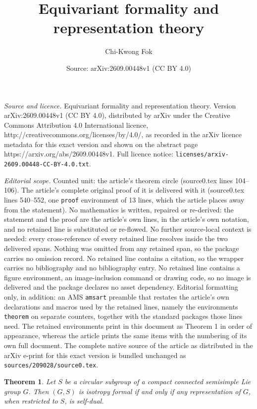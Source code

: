 \documentclass[10pt,a4paper]{amsart}
\title{Equivariant formality and representation theory}
\author{Chi-Kwong Fok}
\date{Source: arXiv:2609.00448v1 (CC BY 4.0)}
\newtheorem{theorem}{Theorem}
\begin{document}
\maketitle

\noindent\emph{Source and licence.} Equivariant formality and representation theory. Version arXiv:2609.00448v1 (CC BY 4.0), distributed by arXiv under the Creative Commons Attribution 4.0 International licence, http://creativecommons.org/licenses/by/4.0/, as recorded in the arXiv licence metadata for this exact version and shown on the abstract page https://arxiv.org/abs/2609.00448v1. Full licence notice: \texttt{licenses/arxiv-2609.00448-CC-BY-4.0.txt}.\par\smallskip

\noindent\textit{Editorial scope.} Counted unit: the article's theorem circle (source0.tex lines 104--106). The article's complete original proof of it is delivered with it (source0.tex lines 540--552, one \texttt{proof} environment of 13 lines, which the article places away from the statement). No mathematics is written, repaired or re-derived: the statement and the proof are the article's own lines, in the article's own notation, and no retained line is substituted or re-flowed.  No further source-local context is needed: every cross-reference of every retained line resolves inside the two delivered spans.  Nothing was omitted from any retained span, so the package carries no omission record.  No retained line contains a citation, so the wrapper carries no bibliography and no bibliography entry.  No retained line contains a figure environment, an image-inclusion command or drawing code, so no image is delivered and the package declares no asset dependency.  Editorial formatting only, in addition: an AMS \texttt{amsart} preamble that restates the article's own declarations and macros used by the retained lines, namely the environments \texttt{theorem} on separate counters, together with the standard packages those lines need.  The retained environments print in this document as Theorem 1 in order of appearance, whereas the article prints the same items with the numbering of its own full document.  The complete native source of the article as distributed in the arXiv e-print for this exact version is bundled unchanged as \texttt{sources/209028/source0.tex}.
\begin{theorem}\label{circle}
	Let $S$ be a circular subgroup of a compact connected semisimple Lie group $G$. Then $(G, S)$ is isotropy formal if and only if any representation of $G$, when restricted to $S$, is self-dual. 
\end{theorem}
\end{document}
